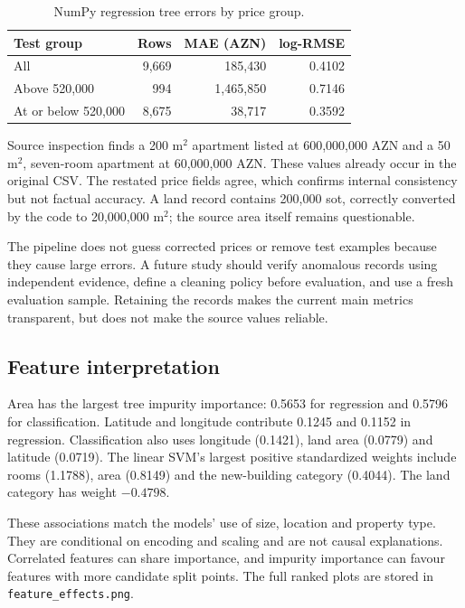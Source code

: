 \documentclass[10pt,twocolumn,a4paper]{article}
\begin{document}
\begin{table}[t]\centering\small
\caption{NumPy regression tree errors by price group.}\label{tab:errors}
\begin{tabular}{@{}lrrr@{}}\toprule
Test group & Rows & MAE (AZN) & log-RMSE\\\midrule
All & 9,669 & 185,430 & 0.4102\\
Above 520,000 & 994 & 1,465,850 & 0.7146\\
At or below 520,000 & 8,675 & 38,717 & 0.3592\\\bottomrule
\end{tabular}
\end{table}

Source inspection finds a 200 m$^2$ apartment listed at 600,000,000 AZN and a 50 m$^2$, seven-room apartment at 60,000,000 AZN. These values already occur in the original CSV. The restated price fields agree, which confirms internal consistency but not factual accuracy. A land record contains 200,000 sot, correctly converted by the code to 20,000,000 m$^2$; the source area itself remains questionable.

The pipeline does not guess corrected prices or remove test examples because they cause large errors. A future study should verify anomalous records using independent evidence, define a cleaning policy before evaluation, and use a fresh evaluation sample. Retaining the records makes the current main metrics transparent, but does not make the source values reliable.

\subsection{Feature interpretation}
Area has the largest tree impurity importance: 0.5653 for regression and 0.5796 for classification. Latitude and longitude contribute 0.1245 and 0.1152 in regression. Classification also uses longitude (0.1421), land area (0.0779) and latitude (0.0719). The linear SVM's largest positive standardized weights include rooms (1.1788), area (0.8149) and the new-building category (0.4044). The land category has weight $-0.4798$.

These associations match the models' use of size, location and property type. They are conditional on encoding and scaling and are not causal explanations. Correlated features can share importance, and impurity importance can favour features with more candidate split points. The full ranked plots are stored in \texttt{feature\_effects.png}.
\end{document}
